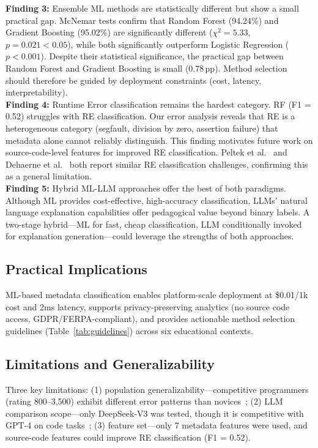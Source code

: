 \documentclass[10pt,a4paper]{article}
\begin{document}
\textbf{Finding 3:} Ensemble ML methods are statistically different but show a
small practical gap. McNemar tests confirm that Random Forest (94.24\%) and
Gradient Boosting (95.02\%) are significantly different ($\chi^2 = 5.33$,
$p = 0.021 < 0.05$), while both significantly outperform Logistic Regression
($p < 0.001$). Despite their statistical significance, the practical gap
between Random Forest and Gradient Boosting is small (0.78\,pp). Method
selection should therefore be guided by deployment constraints (cost, latency,
interpretability).\\

\textbf{Finding 4:} Runtime Error classification remains the hardest category.
RF (F1 = 0.52) struggles with RE classification. Our error analysis reveals
that RE is a heterogeneous category (segfault, division by zero, assertion
failure) that metadata alone cannot reliably distinguish. This finding
motivates future work on source-code-level features for improved RE
classification. Peltek et al.~\cite{peltek2025classifying} and
Dehaerne et al.~\cite{dehaerne2025learned} both report similar RE
classification challenges, confirming this as a general limitation.\\

\textbf{Finding 5:} Hybrid ML-LLM approaches offer the best of both paradigms.
Although ML provides cost-effective, high-accuracy classification, LLMs'
natural language explanation capabilities offer pedagogical value beyond
binary labels. A two-stage hybrid---ML for fast, cheap classification, LLM
conditionally invoked for explanation generation---could leverage the
strengths of both approaches.

\subsection*{Practical Implications}
ML-based metadata classification enables platform-scale deployment at
\$0.01/1k cost and 2ms latency, supports privacy-preserving analytics (no
source code access, GDPR/FERPA-compliant), and provides actionable method
selection guidelines (Table~\ref{tab:guidelines}) across six educational
contexts.

\subsection*{Limitations and Generalizability}
Three key limitations: (1) population generalizability---competitive
programmers (rating 800--3,500) exhibit different error patterns than
novices~\cite{lee2022cs1qa,bey2022analyzing}; (2) LLM comparison
scope---only DeepSeek-V3 was tested, though it is competitive with GPT-4 on
code tasks~\cite{deepseek2024technical,deepseek2024deepseekv3}; (3) feature
set---only 7 metadata features were used, and source-code features could
improve RE classification (F1 = 0.52).
\end{document}
